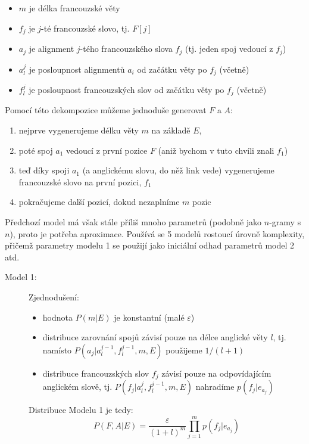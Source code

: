 \documentclass[11pt]{report} %
\numberwithin{equation}{section}
\begin{document}
\begin{description}
\begin{itemize}
		
		\item $m$ je délka francouzské věty
		\item $f_j$ je $j$-té francouzské slovo, tj. $F[j]$
		\item $a_j$ je alignment $j$-tého francouzského slova $f_j$ (tj. jeden spoj vedoucí z $f_j$)
		\item $a_l^{j}$ je posloupnost alignmentů $a_i$ od začátku věty po $f_j$ (včetně)
		\item $f_l^j$ je posloupnost francouzských slov od začátku věty po $f_j$ (včetně)
	\end{itemize}
	Pomocí této dekompozice můžeme jednoduše generovat $F$ a $A$: 
	\begin{enumerate}
		
		
		\item nejprve vygenerujeme délku věty $m$ na základě $E$, 
		\item poté spoj $a_1$ vedoucí z první pozice $F$ (aniž bychom v tuto chvíli znali $f_1$)
		\item teď díky spoji $a_1$ (a anglickému slovu, do něž link vede) vygenerujeme francouzské slovo na první pozici, $f_1$
		\item pokračujeme další pozicí, dokud nezaplníme $m$ pozic
	\end{enumerate}
	
	Předchozí model má však stále příliš mnoho parametrů (podobně jako $n$-gramy s  $n$), proto je potřeba aproximace. Používá se 5 modelů rostoucí úrovně komplexity, přičemž parametry modelu 1 se použijí jako iniciální odhad parametrů model 2 atd.
	\begin{description}
		
		
		\item[Model 1:] Zjednodušení:
		\begin{itemize}
			
			
			\item hodnota $P(m|E)$ je konstantní (malé $\varepsilon$)
			\item distribuce zarovnání spojů závisí pouze na délce anglické věty $l$, tj. namísto $P(a_j | a_l^{j-1}, f_l^{j-1}, m, E)$ použijeme $1 / (l+1)$
			\item distribuce francouzských slov $f_j$ závisí pouze na odpovídajícím anglickém slově, tj. $P(f_j | a_l^j, f_l^{j-1}, m, E)$ nahradíme $p(f_j|e_{a_j})$
		\end{itemize}
		Distribuce Modelu 1 je tedy:
		$$P(F,A|E) = \frac{\varepsilon}{(1+l)^m} \prod_{j=1}^{m} p(f_j | e_{a_j})$$
		

\end{description}
\end{description}
\end{document}

